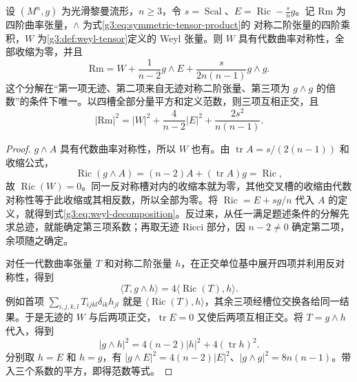 \begin{theorem}\label{g3:thm:weyl-decomposition}
	设 \((M^n,g)\) 为光滑黎曼流形，\(n\ge3\)，令 \(s=\operatorname{Scal}\)、\(E=\operatorname{Ric}-\tfrac{s}{n}g\)。记 \(\mathrm{Rm}\) 为四阶曲率张量，\(\wedge\) 为式\eqref{g3:eq:symmetric-tensor-product}的 对称二阶张量的四阶乘积，\(W\) 为\cref{g3:def:weyl-tensor}定义的 Weyl 张量。则 \(W\) 具有代数曲率对称性，全部收缩为零，并且
	\begin{equation}\label{g3:eq:weyl-decomposition}
		\mathrm{Rm}
		=W+\frac1{n-2}g\wedge E
		+\frac{s}{2n(n-1)}g\wedge g.
	\end{equation}
	这个分解在“第一项无迹、第二项来自无迹对称二阶张量、第三项为 \(g\wedge g\) 的倍数”的条件下唯一。以四槽全部分量平方和定义范数，则三项互相正交，且
	\begin{equation}\label{g3:eq:curvature-norm-decomposition}
		|\mathrm{Rm}|^2=|W|^2+\frac4{n-2}|E|^2
		+\frac{2s^2}{n(n-1)}.
	\end{equation}
\end{theorem}
\begin{proof}
	\(g\wedge A\) 具有代数曲率对称性，所以 \(W\) 也有。由 \(\operatorname{tr}A=s/(2(n-1))\) 和收缩公式，
	\[
		\operatorname{Ric}(g\wedge A)
		=(n-2)A+(\operatorname{tr}A)g=\operatorname{Ric},
	\]
	故 \(\operatorname{Ric}(W)=0\)。同一反对称槽对内的收缩本就为零，其他交叉槽的收缩由代数对称性等于此收缩或其相反数，所以全部为零。将 \(\operatorname{Ric}=E+sg/n\) 代入 \(A\) 的定义，就得到式\eqref{g3:eq:weyl-decomposition}。反过来，从任一满足题述条件的分解先求总迹，就能确定第三项系数；再取无迹 Ricci 部分，因 \(n-2\ne0\) 确定第二项，余项随之确定。

	对任一代数曲率张量 \(T\) 和对称二阶张量 \(h\)，在正交单位基中展开四项并利用反对称性，得到
	\[
		\langle T,g\wedge h\rangle
		=4\langle\operatorname{Ric}(T),h\rangle.
	\]
	例如首项 \(\sum_{i,j,k,l}T_{ijkl}\delta_{ik}h_{jl}\) 就是 \(\langle\operatorname{Ric}(T),h\rangle\)，其余三项经槽位交换各给同一结果。于是无迹的 \(W\) 与后两项正交，\(\operatorname{tr}E=0\) 又使后两项互相正交。将 \(T=g\wedge h\) 代入，得到
	\[
		|g\wedge h|^2=4(n-2)|h|^2+4(\operatorname{tr}h)^2.
	\]
	分别取 \(h=E\) 和 \(h=g\)，有 \(|g\wedge E|^2=4(n-2)|E|^2\)、\(|g\wedge g|^2=8n(n-1)\)。带入三个系数的平方，即得范数等式。
\end{proof}

